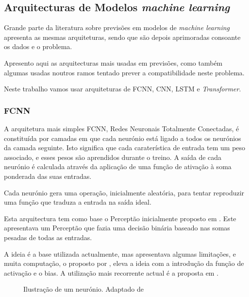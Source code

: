 \subsection{Arquitecturas de Modelos \textit{machine learning}\label{se:arquiteturas_modelos}}

Grande parte da literatura sobre previsões em modelos de \textit{machine learning} apresenta as mesmas arquiteturas, sendo que são depois aprimoradas consoante os dados e o problema.\par
Apresento aqui as arquitecturas mais usadas em previsões, como também algumas usadas noutros ramos tentado prever a compatibilidade neste problema.\par
Neste trabalho vamos usar arquiteturas de \gls{FCNN}, \gls{CNN}, \gls{LSTM} e \textit{Transformer}.\par




\subsubsection{FCNN\label{se:fcnn_sec}}

A arquitetura mais simples \gls{FCNN}, Redes Neuronais Totalmente Conectadas, é constituída por camadas em que cada neurónio está ligado a todos os neurónios da camada seguinte. Isto significa que cada caraterística de entrada tem um peso associado, e esses pesos são aprendidos durante o treino. A saída de cada neurónio é calculada através da aplicação de uma função de ativação à soma ponderada das suas entradas.\par
Cada neurónio gera uma operação, inicialmente aleatória, para tentar reproduzir uma função que traduza a entrada na saída ideal.\par
Esta arquitectura tem como base o Perceptão inicialmente proposto em \cite{Rosenblatt1958}. Este apresentava um Perceptão que fazia uma decisão binária baseado nas somas pesadas de todas as entradas.\par
A ideia é a base utilizada actualmente, mas apresentava algumas limitações, e muita computação, o proposto por \cite{Minsky1969}, eleva a ideia com a introdução da função de activação e o bias. A utilização mais recorrente actual é a proposta em \cite{Haykin1999}.


\begin{figure}[H]
	\centering
	\resizebox{\linewidth}{!}{}
	\caption{Ilustração de um neurónio. Adaptado de \cite{Haykin1999}}
	\label{fig:neuronio}
\end{figure}



